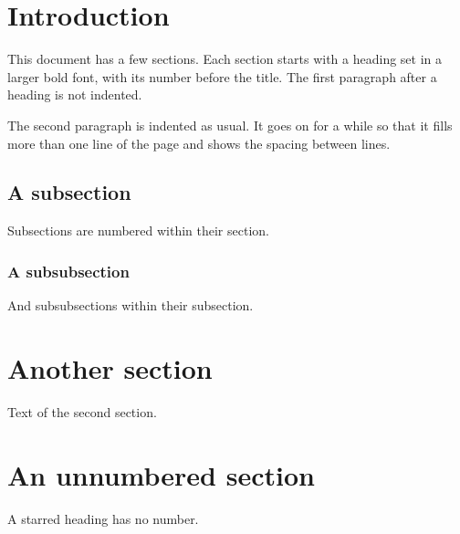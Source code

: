 \documentclass{article}
\begin{document}
\section{Introduction}
This document has a few sections. Each section starts with a heading set in a larger bold font,
with its number before the title. The first paragraph after a heading is not indented.

The second paragraph is indented as usual. It goes on for a while so that it fills more than
one line of the page and shows the spacing between lines.
\subsection{A subsection}
Subsections are numbered within their section.
\subsubsection{A subsubsection}
And subsubsections within their subsection.
\section{Another section}
Text of the second section.
\section*{An unnumbered section}
A starred heading has no number.
\end{document}
